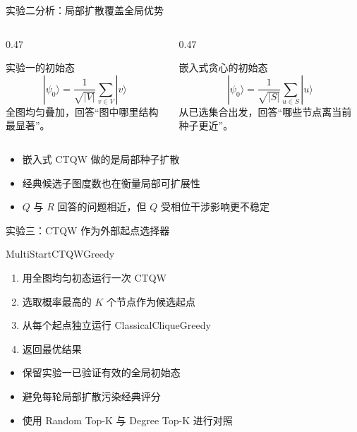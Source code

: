 \documentclass[aspectratio=169,10pt]{ctexbeamer}
\begin{document}
\begin{frame}{实验二分析：局部扩散覆盖全局优势}
  \begin{columns}[T,onlytextwidth]
    \begin{column}{0.47\textwidth}
      \begin{block}{实验一的初始态}
        \[
          |\psi_0\rangle=\frac{1}{\sqrt{|V|}}\sum_{v\in V}|v\rangle
        \]
        全图均匀叠加，回答“图中哪里结构最显著”。
      \end{block}
    \end{column}
    \begin{column}{0.47\textwidth}
      \begin{block}{嵌入式贪心的初始态}
        \[
          |\psi_0\rangle=\frac{1}{\sqrt{|S|}}\sum_{u\in S}|u\rangle
        \]
        从已选集合出发，回答“哪些节点离当前种子更近”。
      \end{block}
    \end{column}
  \end{columns}

  \vspace{1em}
  \begin{itemize}
    \item 嵌入式 CTQW 做的是局部种子扩散
    \item 经典候选子图度数也在衡量局部可扩展性
    \item $Q$ 与 $R$ 回答的问题相近，但 $Q$ 受相位干涉影响更不稳定
  \end{itemize}
\end{frame}

\begin{frame}{实验三：CTQW 作为外部起点选择器}
  \begin{block}{MultiStartCTQWGreedy}
    \begin{enumerate}
      \item 用全图均匀初态运行一次 CTQW
      \item 选取概率最高的 $K$ 个节点作为候选起点
      \item 从每个起点独立运行 ClassicalCliqueGreedy
      \item 返回最优结果
    \end{enumerate}
  \end{block}

  \vspace{0.6em}

  \begin{itemize}
    \item 保留实验一已验证有效的全局初始态
    \item 避免每轮局部扩散污染经典评分
    \item 使用 Random Top-K 与 Degree Top-K 进行对照
  \end{itemize}
\end{frame}
\end{document}
